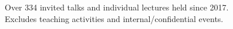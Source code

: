 \newcommand{\talkref}[4]{``#3'' (#2).\\\textit{#4}}
\newcommand{\talkrefwnote}[5]{``#3'' (#2).\\\textit{#4, (#5)}}

\ifdefined\shortcv
    {
        \hspace*{\fill} Over 334 invited talks and individual lectures held since 2017.\\
        \hspace*{\fill} Excludes teaching activities and internal/confidential events.
    }
\else
    {
        
        
    }
\fi


